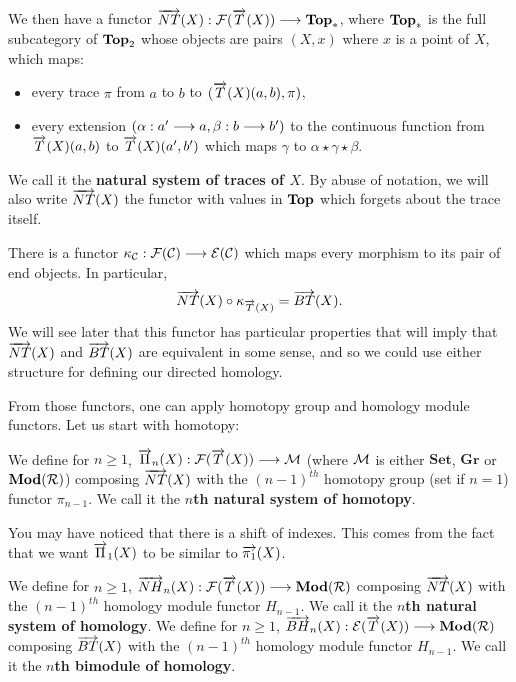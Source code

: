 We then have a functor $\overrightarrow{NT}(X) : \mathcal{F}(\overrightarrow{T}(X)) \longrightarrow \textbf{Top}_\ast$, where $\textbf{Top}_\ast$ is the full subcategory of $\textbf{Top}_2$ whose objects are pairs $(X,x)$ where $x$ is a point of $X$, which maps:
\begin{itemize}
	\item every trace $\pi$ from $a$ to $b$ to $(\overrightarrow{T}(X)(a,b),\pi)$,
	\item every extension $(\alpha : a' \longrightarrow a,\beta : b \longrightarrow b')$ to the continuous function from $\overrightarrow{T}(X)(a,b)$ to $\overrightarrow{T}(X)(a',b')$ which maps $\gamma$ to $\alpha\star\gamma\star\beta$.
\end{itemize}
We call it the \textbf{natural system of traces of $X$}. By abuse of notation, we will also write $\overrightarrow{NT}(X)$ the functor with values in $\textbf{Top}$ which forgets about the trace itself.

There is a functor $\kappa_{\mathcal{C}} : \mathcal{F}(\mathcal{C}) \longrightarrow \mathcal{E}(\mathcal{C})$ which maps every morphism to its pair of end objects. In particular, $$\overrightarrow{NT}(X)\circ\kappa_{\overrightarrow{T}(X)} = \overrightarrow{BT}(X).$$
 We will see later that this functor has particular properties that will imply that $\overrightarrow{NT}(X)$ and $\overrightarrow{BT}(X)$ are equivalent in some sense, and so we could use either structure for defining our directed homology.


From those functors, one can apply homotopy group and homology module functors. Let us start with homotopy:
\begin{defi}
We define for $n\geq 1$, $\overrightarrow{\Pi}_{n}(X) : \mathcal{F}(\overrightarrow{T}(X)) \longrightarrow \mathcal{M}$ (where $\mathcal{M}$ is either $\textbf{Set}$, $\textbf{Gr}$ or $\textbf{Mod}(\mathcal{R})$) composing $\overrightarrow{NT}(X)$ with the $(n-1)^{th}$ homotopy group (set if $n=1$) functor $\pi_{n-1}$. We call it the \textbf{$n$th natural system of homotopy}.
\end{defi}

You may have noticed that there is a shift of indexes. This comes from the fact that we want $\overrightarrow{\Pi}_{1}(X)$ to be similar to $\overrightarrow{\pi_1}(X)$.

\begin{defi}
We define for $n\geq 1$, $\overrightarrow{NH}_{n}(X) : \mathcal{F}(\overrightarrow{T}(X)) \longrightarrow \textbf{Mod}(\mathcal{R})$ composing $\overrightarrow{NT}(X)$ with the $(n-1)^{th}$ homology module functor $H_{n-1}$. We call it the \textbf{$n$th natural system of homology}. 
We define for $n\geq 1$, $\overrightarrow{BH}_{n}(X) : \mathcal{E}(\overrightarrow{T}(X)) \longrightarrow \textbf{Mod}(\mathcal{R})$ composing $\overrightarrow{BT}(X)$ with the $(n-1)^{th}$ homology module functor $H_{n-1}$. We call it the \textbf{$n$th bimodule of homology}. 
\end{defi}


